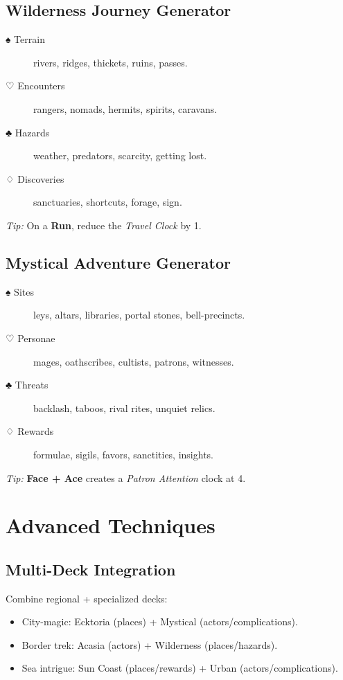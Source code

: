 \begin{multicols}{2}
\subsection*{Wilderness Journey Generator}
\begin{description}
  \item[♠ Terrain] rivers, ridges, thickets, ruins, passes.
  \item[♡ Encounters] rangers, nomads, hermits, spirits, caravans.
  \item[♣ Hazards] weather, predators, scarcity, getting lost.
  \item[♢ Discoveries] sanctuaries, shortcuts, forage, sign.
\end{description}
\emph{Tip:} On a \textbf{Run}, reduce the \emph{Travel Clock} by 1.

\subsection*{Mystical Adventure Generator}
\begin{description}
  \item[♠ Sites] leys, altars, libraries, portal stones, bell-precincts.
  \item[♡ Personae] mages, oathscribes, cultists, patrons, witnesses.
  \item[♣ Threats] backlash, taboos, rival rites, unquiet relics.
  \item[♢ Rewards] formulae, sigils, favors, sanctities, insights.
\end{description}
\emph{Tip:} \textbf{Face + Ace} creates a \emph{Patron Attention} clock at 4. 

\section{Advanced Techniques}

\subsection*{Multi-Deck Integration}
Combine regional + specialized decks:
\begin{itemize}
  \item City-magic: Ecktoria (places) + Mystical (actors/complications).
  \item Border trek: Acasia (actors) + Wilderness (places/hazards).
  \item Sea intrigue: Sun Coast (places/rewards) + Urban (actors/complications).
\end{itemize}


\end{multicols}
